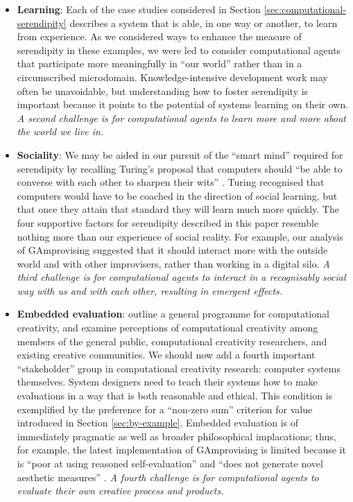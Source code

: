 \begin{itemize}
\item \textbf{Learning}: Each of the case studies considered in
  Section \ref{sec:computational-serendipity} describes a system that
  is able, in one way or another, to learn from experience.  As we
  considered ways to enhance the measure of serendipity in these
  examples, we were led to consider computational agents that
  participate more meaningfully in ``our world'' rather than in a
  circumscribed microdomain.  Knowledge-intensive development work may
  often be unavoidable, but understanding how to foster serendipity is
  important because it points to the potential of systems learning on
  their own.  \emph{A second challenge is for computational agents to
    learn more and more about the world we live in.}
\end{itemize}

\begin{itemize}
\item \textbf{Sociality}: We may be aided in our pursuit of the
  ``smart mind'' required for serendipity by recalling Turing's
  proposal that computers should ``be able to converse with each other
  to sharpen their wits'' \cite{turing-intelligent}.  Turing
  recognised that computers would have to be coached in the direction
  of social learning, but that once they attain that standard they
  will learn much more quickly.  The four supportive factors for
  serendipity described in this paper resemble nothing more than our
  experience of social reality.  For example, our analysis of {\sf
    GAmprovising} suggested that it should interact more with the
  outside world and with other improvisers, rather than working in a
  digital silo.  \emph{A third challenge is for computational agents
    to interact in a recognisably social way with us and with each
    other, resulting in emergent effects.}
\end{itemize}

\begin{itemize}
\item \textbf{Embedded evaluation}:
   outline a general programme
  for computational creativity, and examine perceptions of computational creativity among members of the general public,
  computational creativity researchers, and existing creative
  communities.  We should now add a fourth important ``stakeholder''
  group in computational creativity research: computer systems
  themselves.  System designers need to teach their systems how to
  make evaluations in a way that is both reasonable and ethical.  This
  condition is exemplified by the preference for a ``non-zero sum''
  criterion for value introduced in Section \ref{sec:by-example}.
  Embedded evaluation is of immediately pragmatic as well as broader philosophical implacations;
  thus, for example, the latest implementation of {\sf GAmprovising} is limited
  because it is ``poor at using reasoned self-evaluation''
  and ``does not generate novel aesthetic measures''  \cite[pp.~189, 288]{jordanous2012evaluating}.
  \emph{A fourth challenge is for computational agents to evaluate
    their own creative process and products.}
\end{itemize}


